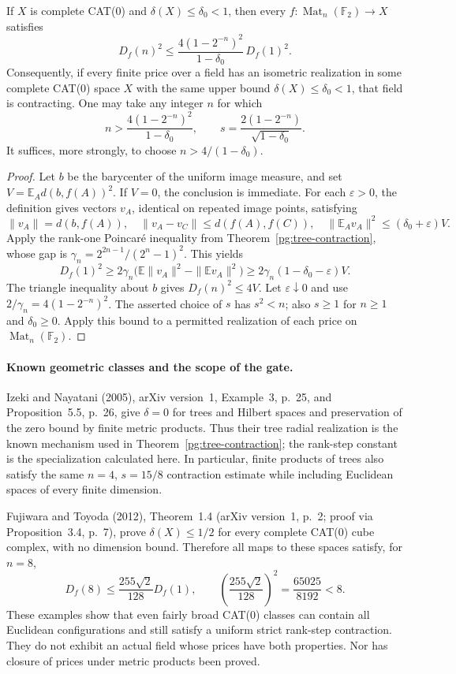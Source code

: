 \begin{proposition}[PG-IN-GATE]
\label{pg:in-gate}
If $X$ is complete CAT(0) and $\delta(X)\leq\delta_0<1$, then every
$f:\operatorname{Mat}_n(\mathbb F_2)\to X$ satisfies
\[
 D_f(n)^2\leq
 \frac{4(1-2^{-n})^2}{1-\delta_0}\,D_f(1)^2.
 \tag{PG-IN}
\]
Consequently, if every finite price over a field has an isometric
realization in some complete CAT(0) space $X$ with the same upper bound
$\delta(X)\leq\delta_0<1$, that field is contracting. One may take any
integer $n$ for which
\[
 n>\frac{4(1-2^{-n})^2}{1-\delta_0},
 \qquad
 s=\frac{2(1-2^{-n})}{\sqrt{1-\delta_0}}.
\]
It suffices, more strongly, to choose $n>4/(1-\delta_0)$.
\end{proposition}
\begin{proof}
Let $b$ be the barycenter of the uniform image measure, and set
$V=\mathbb E_A d(b,f(A))^2$. If $V=0$, the conclusion is immediate.
For each $\varepsilon>0$, the definition gives vectors $v_A$, identical
on repeated image points, satisfying
\[
 \|v_A\|=d(b,f(A)),\quad
 \|v_A-v_C\|\leq d(f(A),f(C)),\quad
 \|\mathbb E_Av_A\|^2\leq(\delta_0+\varepsilon)V.
\]
Apply the rank-one Poincar\'e inequality from
Theorem~\ref{pg:tree-contraction}, whose gap is
$\gamma_n=2^{2n-1}/(2^n-1)^2$. This yields
\[
 D_f(1)^2\geq2\gamma_n
 \bigl(\mathbb E\|v_A\|^2-\|\mathbb E v_A\|^2\bigr)
 \geq2\gamma_n(1-\delta_0-\varepsilon)V.
\]
The triangle inequality about $b$ gives $D_f(n)^2\leq4V$.
Let $\varepsilon\downarrow0$ and use
$2/\gamma_n=4(1-2^{-n})^2$. The asserted choice of $s$ has
$s^2<n$; also $s\geq1$ for $n\geq1$ and $\delta_0\geq0$.
Apply this bound to a permitted realization of each price on
$\operatorname{Mat}_n(\mathbb F_2)$.
\end{proof}

\paragraph{Known geometric classes and the scope of the gate.}
Izeki and Nayatani (2005), arXiv version~1, Example~3, p.~25,
and Proposition~5.5, p.~26, give $\delta=0$ for trees and Hilbert
spaces and preservation of the zero bound by finite metric products.
Thus their tree radial realization is the known mechanism used in
Theorem~\ref{pg:tree-contraction}; the rank-step constant is the
specialization calculated here. In particular, finite products of trees
also satisfy the same $n=4$, $s=15/8$ contraction estimate while
including Euclidean spaces of every finite dimension.

Fujiwara and Toyoda (2012), Theorem~1.4 (arXiv version~1, p.~2;
proof via Proposition~3.4, p.~7), prove
$\delta(X)\leq1/2$ for every complete CAT(0) cube complex, with no
dimension bound. Therefore all maps to these spaces satisfy, for $n=8$,
\[
 D_f(8)\leq \frac{255\sqrt2}{128}D_f(1),
 \qquad \left(\frac{255\sqrt2}{128}\right)^2
 =\frac{65025}{8192}<8.
\]
These examples show that even fairly broad CAT(0) classes can contain all
Euclidean configurations and still satisfy a uniform strict rank-step
contraction. They do not exhibit an actual field whose prices have both
properties. Nor has closure of prices under metric products been proved.

